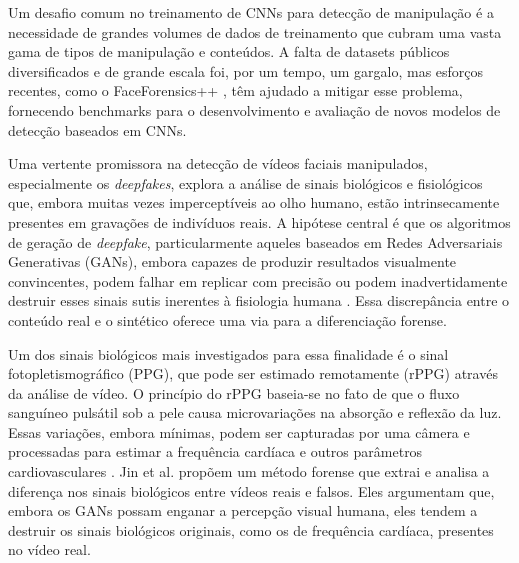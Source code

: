 Um desafio comum no treinamento de CNNs para detecção de manipulação é a necessidade de grandes volumes de dados de treinamento que cubram uma vasta gama de tipos de manipulação e conteúdos. A falta de datasets públicos diversificados e de grande escala foi, por um tempo, um gargalo, mas esforços recentes, como o FaceForensics++ \cite{langguth2021dont}, têm ajudado a mitigar esse problema, fornecendo benchmarks para o desenvolvimento e avaliação de novos modelos de detecção baseados em CNNs.

Uma vertente promissora na detecção de vídeos faciais manipulados, especialmente os \textit{deepfakes}, explora a análise de sinais biológicos e fisiológicos que, embora muitas vezes imperceptíveis ao olho humano, estão intrinsecamente presentes em gravações de indivíduos reais. A hipótese central é que os algoritmos de geração de \textit{deepfake}, particularmente aqueles baseados em Redes Adversariais Generativas (GANs), embora capazes de produzir resultados visualmente convincentes, podem falhar em replicar com precisão ou podem inadvertidamente destruir esses sinais sutis inerentes à fisiologia humana \cite{jin2021analise}. Essa discrepância entre o conteúdo real e o sintético oferece uma via para a diferenciação forense.

Um dos sinais biológicos mais investigados para essa finalidade é o sinal fotopletismográfico (PPG), que pode ser estimado remotamente (rPPG) através da análise de vídeo. O princípio do rPPG baseia-se no fato de que o fluxo sanguíneo pulsátil sob a pele causa microvariações na absorção e reflexão da luz. Essas variações, embora mínimas, podem ser capturadas por uma câmera e processadas para estimar a frequência cardíaca e outros parâmetros cardiovasculares \cite{jin2021analise}. Jin et al. \cite{jin2021analise} propõem um método forense que extrai e analisa a diferença nos sinais biológicos entre vídeos reais e falsos. Eles argumentam que, embora os GANs possam enganar a percepção visual humana, eles tendem a destruir os sinais biológicos originais, como os de frequência cardíaca, presentes no vídeo real.

